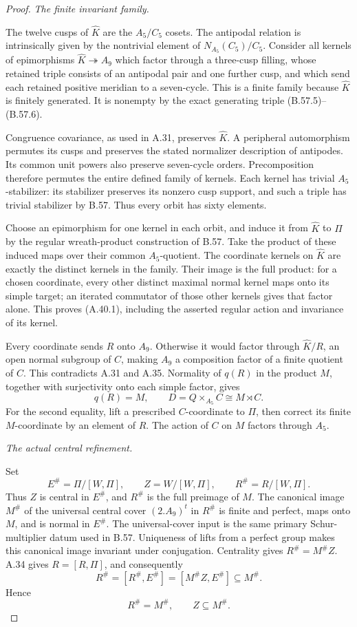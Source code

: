\begin{proof}
\emph{The finite invariant family.}\par
The twelve cusps of \(\widehat K\) are the
\(A_5/C_5\) cosets. The antipodal relation is
intrinsically given by the nontrivial element of
\(N_{A_5}(C_5)/C_5\). Consider all kernels of
epimorphisms \(\widehat K\twoheadrightarrow A_9\)
which factor through a three-cusp filling, whose
retained triple consists of an antipodal pair and
one further cusp, and which send each retained
positive meridian to a seven-cycle. This is a finite
family because \(\widehat K\) is finitely generated.
It is nonempty by the exact generating triple
(B.57.5)--(B.57.6).

Congruence covariance, as used in A.31, preserves
\(\widehat K\). A peripheral automorphism permutes
its cusps and preserves the stated normalizer
description of antipodes. Its common unit powers
also preserve seven-cycle orders. Precomposition
therefore permutes the entire defined family of
kernels. Each kernel has trivial \(A_5\)-stabilizer:
its stabilizer preserves its nonzero cusp support,
and such a triple has trivial stabilizer by B.57.
Thus every orbit has sixty elements.

Choose an epimorphism for one kernel in each orbit,
and induce it from \(\widehat K\) to \(\Pi\) by
the regular wreath-product construction of B.57.
Take the product of these induced maps over their
common \(A_5\)-quotient. The coordinate kernels
on \(\widehat K\) are exactly the distinct kernels
in the family. Their image is the full product:
for a chosen coordinate, every other distinct
maximal normal kernel maps onto its simple target;
an iterated commutator of those other kernels gives
that factor alone. This proves (A.40.1), including
the asserted regular action and invariance of its
kernel.

Every coordinate sends \(R\) onto \(A_9\).
Otherwise it would factor through
\(\widehat K/R\), an open normal subgroup of
\(C\), making \(A_9\) a composition factor of a
finite quotient of \(C\). This contradicts
A.31 and A.35. Normality of \(q(R)\) in the
product \(M\), together with surjectivity onto
each simple factor, gives
\[
 q(R)=M,\qquad
 D=Q\times_{A_5}C\cong M\rtimes C.
 \tag{A.40.2}
\]
For the second equality, lift a prescribed
\(C\)-coordinate to \(\Pi\), then correct its
finite \(M\)-coordinate by an element of \(R\).
The action of \(C\) on \(M\) factors through
\(A_5\).

\emph{The actual central refinement.}\par
Set
\[
 E^\#=\Pi/[W,\Pi],\qquad Z=W/[W,\Pi],
 \qquad R^\#=R/[W,\Pi].
\]
Thus \(Z\) is central in \(E^\#\), and
\(R^\#\) is the full preimage of \(M\).
The canonical image \(M^\#\) of the universal
central cover \((2.A_9)^t\) in \(R^\#\) is
finite and perfect, maps onto \(M\), and is
normal in \(E^\#\). The universal-cover input is
the same primary Schur-multiplier datum used in
B.57.\cite{CEAtlasA9}
Uniqueness of lifts from a perfect group makes
this canonical image invariant under conjugation.
Centrality gives \(R^\#=M^\# Z\). A.34 gives
\(R=[R,\Pi]\), and consequently
\[
 R^\#=[R^\#,E^\#]=[M^\# Z,E^\#]\subseteq M^\#.
\]
Hence
\[
                   R^\#=M^\#,
                   \qquad Z\subseteq M^\#.
 \tag{A.40.3}
\]


\end{proof}
